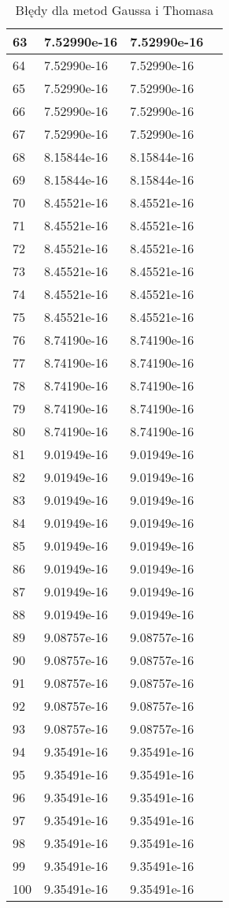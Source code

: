 \documentclass{article}
\begin{document}
\begin{table}[H]
{\begin{tabular}{|l|l|l|l|}
63 & 7.52990e-16 & 7.52990e-16 \\ \hline
64 & 7.52990e-16 & 7.52990e-16 \\ \hline
65 & 7.52990e-16 & 7.52990e-16 \\ \hline
66 & 7.52990e-16 & 7.52990e-16 \\ \hline
67 & 7.52990e-16 & 7.52990e-16 \\ \hline
68 & 8.15844e-16 & 8.15844e-16 \\ \hline
69 & 8.15844e-16 & 8.15844e-16 \\ \hline
70 & 8.45521e-16 & 8.45521e-16 \\ \hline
71 & 8.45521e-16 & 8.45521e-16 \\ \hline
72 & 8.45521e-16 & 8.45521e-16 \\ \hline
73 & 8.45521e-16 & 8.45521e-16 \\ \hline
74 & 8.45521e-16 & 8.45521e-16 \\ \hline
75 & 8.45521e-16 & 8.45521e-16 \\ \hline
76 & 8.74190e-16 & 8.74190e-16 \\ \hline
77 & 8.74190e-16 & 8.74190e-16 \\ \hline
78 & 8.74190e-16 & 8.74190e-16 \\ \hline
79 & 8.74190e-16 & 8.74190e-16 \\ \hline
80 & 8.74190e-16 & 8.74190e-16 \\ \hline
81 & 9.01949e-16 & 9.01949e-16 \\ \hline
82 & 9.01949e-16 & 9.01949e-16 \\ \hline
83 & 9.01949e-16 & 9.01949e-16 \\ \hline
84 & 9.01949e-16 & 9.01949e-16 \\ \hline
85 & 9.01949e-16 & 9.01949e-16 \\ \hline
86 & 9.01949e-16 & 9.01949e-16 \\ \hline
87 & 9.01949e-16 & 9.01949e-16 \\ \hline
88 & 9.01949e-16 & 9.01949e-16 \\ \hline
89 & 9.08757e-16 & 9.08757e-16 \\ \hline
90 & 9.08757e-16 & 9.08757e-16 \\ \hline
91 & 9.08757e-16 & 9.08757e-16 \\ \hline
92 & 9.08757e-16 & 9.08757e-16 \\ \hline
93 & 9.08757e-16 & 9.08757e-16 \\ \hline
94 & 9.35491e-16 & 9.35491e-16 \\ \hline
95 & 9.35491e-16 & 9.35491e-16 \\ \hline
96 & 9.35491e-16 & 9.35491e-16 \\ \hline
97 & 9.35491e-16 & 9.35491e-16 \\ \hline
98 & 9.35491e-16 & 9.35491e-16 \\ \hline
99 & 9.35491e-16 & 9.35491e-16 \\ \hline
100 & 9.35491e-16 & 9.35491e-16 \\ \hline
\end{tabular}
}
\caption{Błędy dla metod Gaussa i Thomasa}
\end{table}
\end{document}

